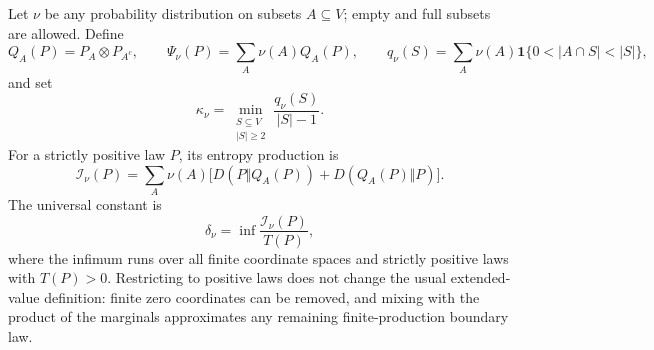 \documentclass[11pt,a4paper]{article}
\theoremstyle{definition}\newtheorem{definition}[theorem]{Definition}
\theoremstyle{remark}\newtheorem{remark}[theorem]{Remark}
\numberwithin{equation}{section}
\begin{document}
Let $\nu$ be any probability distribution on subsets $A\subseteq V$;
empty and full subsets are allowed.  Define
\[
 Q_A(P)=P_A\otimes P_{A^c},\qquad
 \Psi_\nu(P)=\sum_A\nu(A)Q_A(P),\qquad
 q_\nu(S)=\sum_A\nu(A)\mathbf1\{0<|A\cap S|<|S|\},
\]
and set
\begin{equation}\label{ext-reiwa-kappa}
 \kappa_\nu=
 \min_{\substack{S\subseteq V\\|S|\geq2}}
       \frac{q_\nu(S)}{|S|-1}.
\end{equation}
For a strictly positive law $P$, its entropy production is
\begin{equation}\label{ext-reiwa-production}
 \mathcal I_\nu(P)=
 \sum_A\nu(A)\bigl[D(P\Vert Q_A(P))+D(Q_A(P)\Vert P)\bigr].
\end{equation}
The universal constant is
\[
 \delta_\nu=\inf\frac{\mathcal I_\nu(P)}{T(P)},
\]
where the infimum runs over all finite coordinate spaces and strictly
positive laws with $T(P)>0$.  Restricting to positive laws does not
change the usual extended-value definition: finite zero coordinates
can be removed, and mixing with the product of the marginals
approximates any remaining finite-production boundary law.
\end{document}
